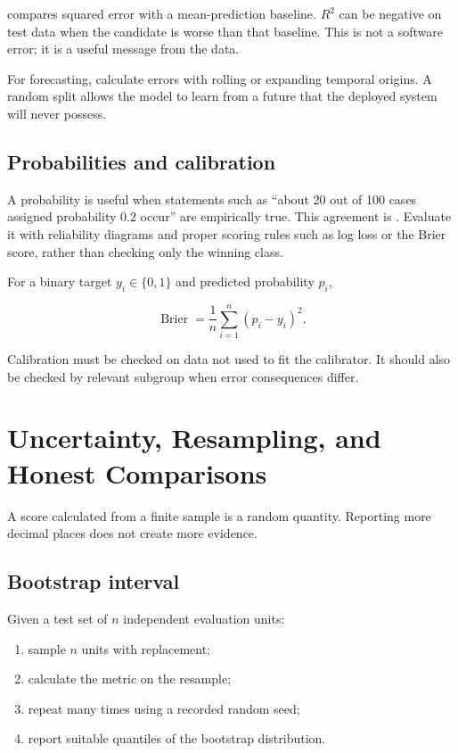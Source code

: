 compares squared error with a mean-prediction baseline.
$R^2$ can be negative on test data when the candidate is worse than that
baseline.
This is not a software error; it is a useful message from the data.

For forecasting, calculate errors with rolling or expanding temporal origins.
A random split allows the model to learn from a future that the deployed
system will never possess.

\subsection{Probabilities and calibration}

A probability is useful when statements such as ``about 20 out of 100 cases
assigned probability 0.2 occur'' are empirically true.
This agreement is .
Evaluate it with reliability diagrams and proper scoring rules such as log
loss or the Brier score, rather than checking only the winning class.

For a binary target $y_i\in\{0,1\}$ and predicted probability $p_i$,

\begin{equation}
    \operatorname{Brier} = \frac{1}{n}\sum_{i=1}^{n}(p_i-y_i)^2.
    \label{eq:brier-score}
\end{equation}

Calibration must be checked on data not used to fit the calibrator.
It should also be checked by relevant subgroup when error consequences differ.

\section{Uncertainty, Resampling, and Honest Comparisons}

A score calculated from a finite sample is a random quantity.
Reporting more decimal places does not create more evidence.

\subsection{Bootstrap interval}

Given a test set of $n$ independent evaluation units:

\begin{enumerate}
    \item sample $n$ units with replacement;
    \item calculate the metric on the resample;
    \item repeat many times using a recorded random seed;
    \item report suitable quantiles of the bootstrap distribution.
\end{enumerate}

